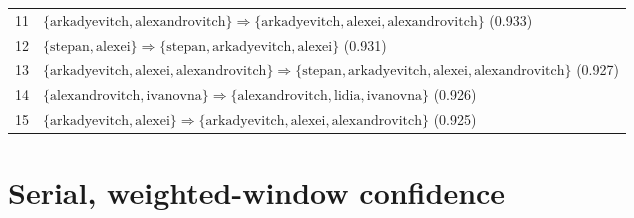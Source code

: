 \begin{appendices}
\begin{longtable}{p{20pt}|p{\dimexpr\textwidth-20pt-\tabcolsep\relax}}
11 & $ \{ \text{arkadyevitch},\allowbreak\text{alexandrovitch} \} \Rightarrow \{ \text{arkadyevitch},\allowbreak\text{alexei},\allowbreak\text{alexandrovitch} \} $ (0.933) \\
12 & $ \{ \text{stepan},\allowbreak\text{alexei} \} \Rightarrow \{ \text{stepan},\allowbreak\text{arkadyevitch},\allowbreak\text{alexei} \} $ (0.931) \\
13 & $ \{ \text{arkadyevitch},\allowbreak\text{alexei},\allowbreak\text{alexandrovitch} \} \Rightarrow \{ \text{stepan},\allowbreak\text{arkadyevitch},\allowbreak\text{alexei},\allowbreak\text{alexandrovitch} \} $ (0.927) \\
14 & $ \{ \text{alexandrovitch},\allowbreak\text{ivanovna} \} \Rightarrow \{ \text{alexandrovitch},\allowbreak\text{lidia},\allowbreak\text{ivanovna} \} $ (0.926) \\
15 & $ \{ \text{arkadyevitch},\allowbreak\text{alexei} \} \Rightarrow \{ \text{arkadyevitch},\allowbreak\text{alexei},\allowbreak\text{alexandrovitch} \} $ (0.925) \\
\end{longtable}

\section{Serial, weighted-window confidence}
\label{appendix:rules-ser-wwi}


\end{appendices}
